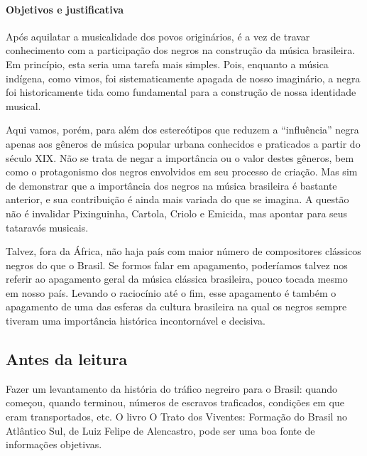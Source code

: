 \documentclass[11pt]{extarticle}
\begin{document}


\paragraph{Objetivos e justificativa }

Após aquilatar a musicalidade dos povos originários, é a vez de travar
conhecimento com a participação dos negros na construção da música brasileira.
Em princípio, esta seria uma tarefa mais simples. Pois, enquanto a música
indígena, como vimos, foi sistematicamente apagada de nosso imaginário, a negra
foi historicamente tida como fundamental para a construção de nossa identidade
musical.

Aqui vamos, porém, para além dos estereótipos que reduzem a “influência” negra
apenas aos gêneros de música popular urbana conhecidos e praticados a partir do
século XIX. Não se trata de negar a importância ou o valor destes gêneros, bem
como o protagonismo dos negros envolvidos em seu processo de criação. Mas sim
de demonstrar que a importância dos negros na música brasileira é bastante
anterior, e sua contribuição é ainda mais variada do que se imagina. A questão
não é invalidar Pixinguinha, Cartola, Criolo e Emicida, mas apontar para seus
tataravós musicais.

Talvez, fora da África, não haja país com maior número de compositores
clássicos negros do que o Brasil. Se formos falar em apagamento, poderíamos
talvez nos referir ao apagamento geral da música clássica brasileira, pouco
tocada mesmo em nosso país. Levando o raciocínio até o fim, esse apagamento é
também o apagamento de uma das esferas da cultura brasileira na qual os negros
sempre tiveram uma importância histórica incontornável e decisiva.


\subsection{Antes da leitura}

Fazer um levantamento da história do tráfico negreiro para o Brasil: quando
começou, quando terminou, números de escravos traficados, condições em que eram
transportados, etc. O livro O Trato dos Viventes: Formação do Brasil no
Atlântico Sul, de Luiz Felipe de Alencastro, pode ser uma boa fonte de
informações objetivas.
\end{document}

